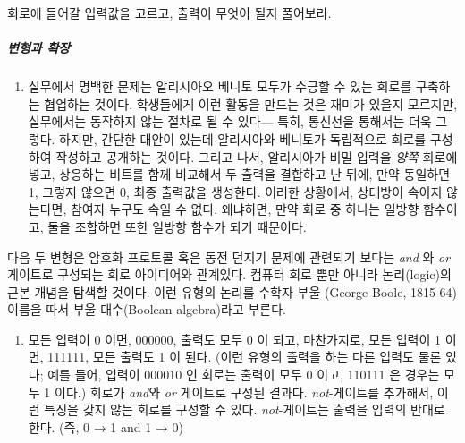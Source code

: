 \documentclass[]{article}
\begin{document}
회로에 들어갈 입력값을 고르고, 출력이 무엇이 될지 풀어보라.

\subparagraph{변형과 확장}\label{section-243}

\begin{enumerate}
\itemsep1pt\parskip0pt
\item
  실무에서 명백한 문제는 알리시아오 베니토 모두가 수긍할 수 있는 회로를
  구축하는 협업하는 것이다. 학생들에게 이런 활동을 만드는 것은 재미가
  있을지 모르지만, 실무에서는 동작하지 않는 절차로 될 수 있다--- 특히,
  통신선을 통해서는 더욱 그렇다. 하지만, 간단한 대안이 있는데 알리시아와
  베니토가 독립적으로 회로를 구성하여 작성하고 공개하는 것이다. 그리고
  나서, 알리시아가 비밀 입력을 \emph{양쪽} 회로에 넣고, 상응하는 비트를
  함께 비교해서 두 출력을 결합하고 난 뒤에, 만약 동일하면 1, 그렇지
  않으면 0, 최종 출력값을 생성한다. 이러한 상황에서, 상대방이 속이지
  않는다면, 참여자 누구도 속일 수 없다. 왜냐하면, 만약 회로 중 하나는
  일방향 함수이고, 둘을 조합하면 또한 일방향 함수가 되기 때문이다.
\end{enumerate}

다음 두 변형은 암호화 프로토콜 혹은 동전 던지기 문제에 관련되기 보다는
\emph{and} 와 \emph{or} 게이트로 구성되는 회로 아이디어와 관계있다.
컴퓨터 회로 뿐만 아니라 논리(logic)의 근본 개념을 탐색할 것이다. 이런
유형의 논리를 수학자 부울 (George Boole, 1815-64) 이름을 따서 부울
대수(Boolean algebra)라고 부른다.

\begin{enumerate}
\itemsep1pt\parskip0pt
\item
  모든 입력이 0 이면, 000000, 출력도 모두 0 이 되고, 마찬가지로, 모든
  입력이 1 이면, 111111, 모든 출력도 1 이 된다. (이런 유형의 출력을 하는
  다른 입력도 물론 있다; 예를 들어, 입력이 000010 인 회로는 출력이 모두
  0 이고, 110111 은 경우는 모두 1 이다.) 회로가 \emph{and}와 \emph{or}
  게이트로 구성된 결과다. \emph{not}-게이트를 추가해서, 이런 특징을 갖지
  않는 회로를 구성할 수 있다. \emph{not}-게이트는 출력을 입력의 반대로
  한다. (즉, 0 → 1 and 1 → 0)
\end{enumerate}
\end{document}

